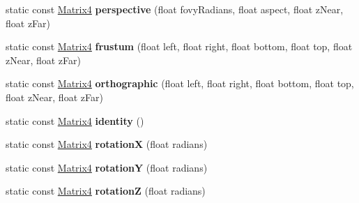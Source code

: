 \begin{DoxyCompactItemize}
\item 
\hypertarget{classVectormath_1_1Aos_1_1Matrix4_a48a05529f2e7e67b42b1ec4d05b6b5b2}{static const \hyperlink{classVectormath_1_1Aos_1_1Matrix4}{Matrix4} {\bfseries perspective} (float fovy\-Radians, float aspect, float z\-Near, float z\-Far)}\label{classVectormath_1_1Aos_1_1Matrix4_a48a05529f2e7e67b42b1ec4d05b6b5b2}

\item 
\hypertarget{classVectormath_1_1Aos_1_1Matrix4_ab9865765b6131b7a32bca48ee68c4b65}{static const \hyperlink{classVectormath_1_1Aos_1_1Matrix4}{Matrix4} {\bfseries frustum} (float left, float right, float bottom, float top, float z\-Near, float z\-Far)}\label{classVectormath_1_1Aos_1_1Matrix4_ab9865765b6131b7a32bca48ee68c4b65}

\item 
\hypertarget{classVectormath_1_1Aos_1_1Matrix4_a92a820b7d8381ac8045da922c6df7fa8}{static const \hyperlink{classVectormath_1_1Aos_1_1Matrix4}{Matrix4} {\bfseries orthographic} (float left, float right, float bottom, float top, float z\-Near, float z\-Far)}\label{classVectormath_1_1Aos_1_1Matrix4_a92a820b7d8381ac8045da922c6df7fa8}

\item 
\hypertarget{classVectormath_1_1Aos_1_1Matrix4_a4f84a22403618b3dfffd7f410dd31697}{static const \hyperlink{classVectormath_1_1Aos_1_1Matrix4}{Matrix4} {\bfseries identity} ()}\label{classVectormath_1_1Aos_1_1Matrix4_a4f84a22403618b3dfffd7f410dd31697}

\item 
\hypertarget{classVectormath_1_1Aos_1_1Matrix4_a5727665fe6a8f581e578c9ca268da7f1}{static const \hyperlink{classVectormath_1_1Aos_1_1Matrix4}{Matrix4} {\bfseries rotation\-X} (float radians)}\label{classVectormath_1_1Aos_1_1Matrix4_a5727665fe6a8f581e578c9ca268da7f1}

\item 
\hypertarget{classVectormath_1_1Aos_1_1Matrix4_a083cd75aa544d7760d85a989da2d1211}{static const \hyperlink{classVectormath_1_1Aos_1_1Matrix4}{Matrix4} {\bfseries rotation\-Y} (float radians)}\label{classVectormath_1_1Aos_1_1Matrix4_a083cd75aa544d7760d85a989da2d1211}

\item 
\hypertarget{classVectormath_1_1Aos_1_1Matrix4_a1f6d2e00f90838b9c79616f0ef13de66}{static const \hyperlink{classVectormath_1_1Aos_1_1Matrix4}{Matrix4} {\bfseries rotation\-Z} (float radians)}\label{classVectormath_1_1Aos_1_1Matrix4_a1f6d2e00f90838b9c79616f0ef13de66}


\end{DoxyCompactItemize}
